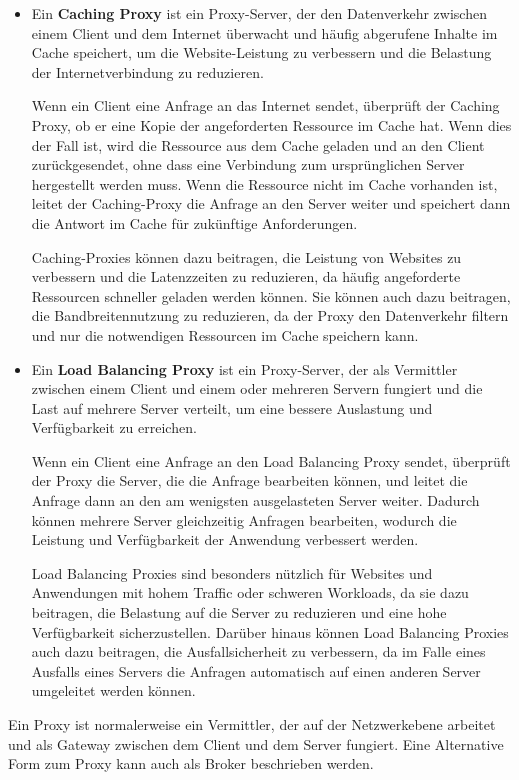 \begin{itemize}
\item Ein \textbf{Caching Proxy} ist ein Proxy-Server, der den Datenverkehr zwischen einem Client und dem Internet überwacht und häufig abgerufene Inhalte im Cache speichert, um die Website-Leistung zu verbessern und die Belastung der Internetverbindung zu reduzieren.

Wenn ein Client eine Anfrage an das Internet sendet, überprüft der Caching Proxy, ob er eine Kopie der angeforderten Ressource im Cache hat. Wenn dies der Fall ist, wird die Ressource aus dem Cache geladen und an den Client zurückgesendet, ohne dass eine Verbindung zum ursprünglichen Server hergestellt werden muss. Wenn die Ressource nicht im Cache vorhanden ist, leitet der Caching-Proxy die Anfrage an den Server weiter und speichert dann die Antwort im Cache für zukünftige Anforderungen.

Caching-Proxies können dazu beitragen, die Leistung von Websites zu verbessern und die Latenzzeiten zu reduzieren, da häufig angeforderte Ressourcen schneller geladen werden können. Sie können auch dazu beitragen, die Bandbreitennutzung zu reduzieren, da der Proxy den Datenverkehr filtern und nur die notwendigen Ressourcen im Cache speichern kann.
\item Ein \textbf{Load Balancing Proxy} ist ein Proxy-Server, der als Vermittler zwischen einem Client und einem oder mehreren Servern fungiert und die Last auf mehrere Server verteilt, um eine bessere Auslastung und Verfügbarkeit zu erreichen.

Wenn ein Client eine Anfrage an den Load Balancing Proxy sendet, überprüft der Proxy die Server, die die Anfrage bearbeiten können, und leitet die Anfrage dann an den am wenigsten ausgelasteten Server weiter. Dadurch können mehrere Server gleichzeitig Anfragen bearbeiten, wodurch die Leistung und Verfügbarkeit der Anwendung verbessert werden.

Load Balancing Proxies sind besonders nützlich für Websites und Anwendungen mit hohem Traffic oder schweren Workloads, da sie dazu beitragen, die Belastung auf die Server zu reduzieren und eine hohe Verfügbarkeit sicherzustellen. Darüber hinaus können Load Balancing Proxies auch dazu beitragen, die Ausfallsicherheit zu verbessern, da im Falle eines Ausfalls eines Servers die Anfragen automatisch auf einen anderen Server umgeleitet werden können.
\end{itemize}
Ein Proxy ist normalerweise ein Vermittler, der  auf der Netzwerkebene arbeitet und als Gateway zwischen dem Client und dem Server fungiert. Eine Alternative Form zum Proxy kann auch als Broker beschrieben werden. 

